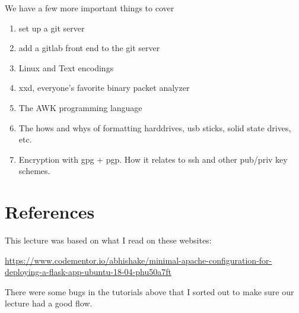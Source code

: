 \documentclass[10pt]{article}
\begin{document}
We have a few more important things to cover
\begin{enumerate}
\item set up a git server
\item add a gitlab front end to the git server
\item Linux and Text encodings
\item xxd, everyone's favorite binary packet analyzer
\item The AWK programming language
\item The hows and whys of formatting harddrives, usb sticks, solid state drives, etc.
\item Encryption with gpg + pgp. How it relates to ssh and other pub/priv key schemes.
\end{enumerate}

\section{References}
This lecture was based on what I read  on these websites:

\url{https://www.codementor.io/abhishake/minimal-apache-configuration-for-deploying-a-flask-app-ubuntu-18-04-phu50a7ft}



There were some bugs in the tutorials above that I sorted out to make sure our lecture had a good flow.
\end{document}
